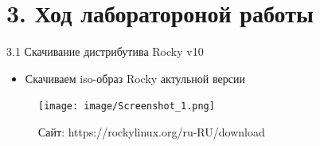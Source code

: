 \documentclass[
  ignorenonframetext,
  aspectratio=169,
  russian,
]{beamer}
\providecommand{\tightlist}{%
  \setlength{\itemsep}{0pt}\setlength{\parskip}{0pt}}
\begin{document}
\section{3. Ход лаборатороной
работы}\label{ux445ux43eux434-ux43bux430ux431ux43eux440ux430ux442ux43eux440ux43eux43dux43eux439-ux440ux430ux431ux43eux442ux44b}

\begin{frame}{3.1 Скачивание дистрибутива Rocky v10}
\label{ux441ux43aux430ux447ux438ux432ux430ux43dux438ux435-ux434ux438ux441ux442ux440ux438ux431ux443ux442ux438ux432ux430-rocky-v10}
\begin{itemize}
\tightlist
\item
  Скачиваем iso-образ Rocky актульной версии
\end{itemize}

\begin{figure}

{\centering \texttt{[image: image/Screenshot\_1.png]}

}

\caption{Сайт: https://rockylinux.org/ru-RU/download}

\end{figure}%
\end{frame}
\end{document}
